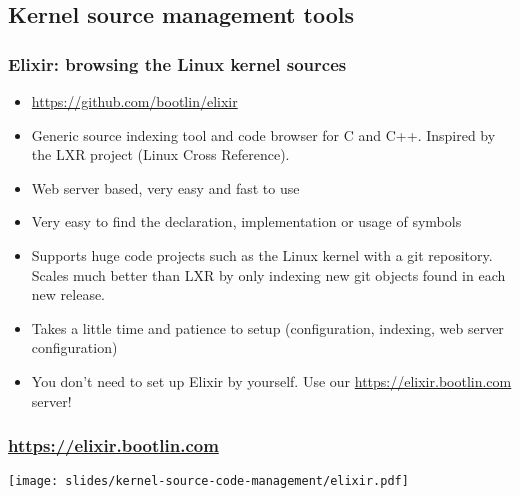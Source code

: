 \subsection{Kernel source management tools}

\begin{frame}
  \frametitle{Elixir: browsing the Linux kernel sources}
  \begin{itemize}
  \item \url{https://github.com/bootlin/elixir}
  \item Generic source indexing tool and code browser for C and C++.
        Inspired by the LXR project (Linux Cross Reference).
  \item Web server based, very easy and fast to use
  \item Very easy to find the declaration, implementation or usage
    of symbols
  \item Supports huge code projects such as the Linux kernel with
     a git repository. Scales much better than LXR  by only indexing
     new git objects found in each new release.
  \item Takes a little time and patience to setup (configuration,
    indexing, web server configuration)
  \item You don't need to set up Elixir by yourself. Use our
    \url{https://elixir.bootlin.com} server!
  \end{itemize}
\end{frame}

\begin{frame}
  \frametitle{\url{https://elixir.bootlin.com}}
  \begin{center}
    \texttt{[image: slides/kernel-source-code-management/elixir.pdf]}
  \end{center}
\end{frame}

